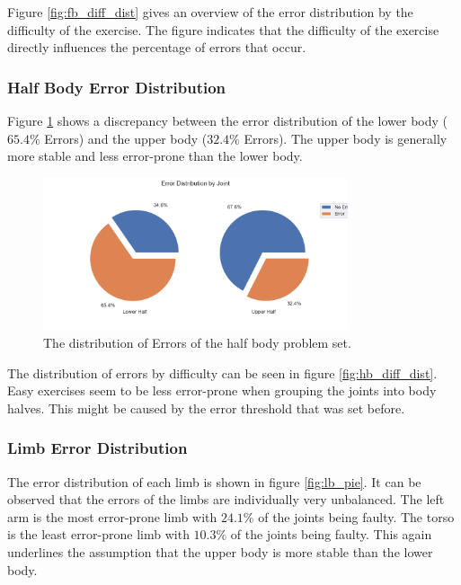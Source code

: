 Figure \ref{fig:fb_diff_dist} gives an overview of the error distribution by the difficulty of the exercise. The figure indicates that the difficulty of the exercise directly influences the percentage of errors that occur.

\subsubsection{Half Body Error Distribution}

Figure \ref{fig:hb_pie} shows a discrepancy between the error distribution of the lower body ($65.4\%$ Errors) and the upper body ($32.4\%$ Errors). The upper body is generally more stable and less error-prone than the lower body.

\begin{figure}
  \centering
  \includegraphics[width=0.8\textwidth]{figures/Data/dist_half_body/Error_Distribution_by_Joint.png}
  \caption[Error Distribution by Body Half]{The distribution of Errors of the half body problem set.}
  \label{fig:hb_pie}
\end{figure}

The distribution of errors by difficulty can be seen in figure \ref{fig:hb_diff_dist}. Easy exercises seem to be less error-prone when grouping the joints into body halves. This might be caused by the error threshold that was set before.

\subsubsection{Limb Error Distribution}

The error distribution of each limb is shown in figure \ref{fig:lb_pie}. It can be observed that the errors of the limbs are individually very unbalanced. The left arm is the most error-prone limb with $24.1\%$ of the joints being faulty. The torso is the least error-prone limb with $10.3\%$ of the joints being faulty. This again underlines the assumption that the upper body is more stable than the lower body.

